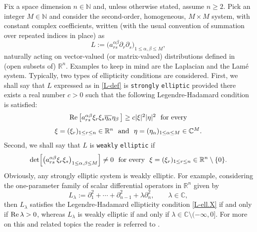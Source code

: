 \documentclass[11pt,reqno]{amsart}
\numberwithin{equation}{section}
\theoremstyle{remark}
\begin{document}
Fix a space dimension $n\in{\mathbb{N}}$ and, unless otherwise stated, assume $n\geq 2$.
Pick an integer $M\in{\mathbb{N}}$ and consider the second-order, homogeneous, $M\times M$ system,
with constant complex coefficients, written (with the usual convention of summation over
repeated indices in place) as
%
\begin{equation}\label{L-def}
L:=\Big(a^{\alpha\beta}_{rs}\partial_r\partial_s\Big)_{1\leq\alpha,\beta\leq M},
\end{equation}
%
naturally acting on vector-valued (or matrix-valued) distributions defined in (open subsets of) ${\mathbb{R}}^n$. 
Examples to keep in mind are the Laplacian and the Lam\'e system. Typically, two types of ellipticity conditions 
are considered. First, we shall say that $L$ expressed as in \eqref{L-def} is {\tt strongly} {\tt elliptic} provided 
there exists a real number $c>0$ such that the following Legendre-Hadamard condition is satisfied:
%
\begin{equation}\label{L-ell.X}
\begin{array}{c}
{\rm Re}\,\big[a^{\alpha\beta}_{rs}\xi_r\xi_s\overline{\eta_\alpha}
\eta_\beta\,\big]\geq c|\xi|^2|\eta|^2\,\,\text{ for every}
\\[8pt]
\xi=(\xi_r)_{1\leq r\leq n}\in{\mathbb{R}}^n\,\,\text{ and }\,\,
\eta=(\eta_\alpha)_{1\leq\alpha\leq M}\in{\mathbb{C}}^M.
\end{array}
\end{equation}
%
Second, we shall say that $L$ is {\tt weakly} {\tt elliptic} if  
%
\begin{equation}\label{Def-ELLa.INTR}
{\rm det}\Big[\big(a^{\alpha\beta}_{rs}\xi_r\xi_s\big)_{1\leq\alpha,\beta\leq M}\Big]\not=0
\,\,\text{ for every }\,\,\xi=(\xi_r)_{1\leq r\leq n}\in{\mathbb{R}}^n\setminus\{0\}.
\end{equation}
%
Obviously, any strongly elliptic system is weakly elliptic. For example, considering the one-parameter family of 
scalar differential operators in ${\mathbb{R}}^n$ given by 
%
\begin{equation}\label{eq:LLLambda}
L_\lambda:=\partial_1^2+\cdots+\partial_{n-1}^2+\lambda\partial_n^2,\qquad\lambda\in{\mathbb{C}},
\end{equation}
%
then $L_\lambda$ satisfies the Legendre-Hadamard ellipticity condition \eqref{L-ell.X} if and only if ${\rm Re}\,\lambda>0$, 
whereas $L_\lambda$ is weakly elliptic if and only if $\lambda\in{\mathbb{C}}\setminus(-\infty,0]$. For more on this and related 
topics the reader is referred to \cite{GHA.III}.
\end{document}
